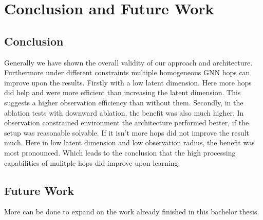 
\chapter{Conclusion and Future Work}
\label{ch:Conclusion}


\section{Conclusion}
Generally we have shown the overall validity of our approach and architecture. Furthermore under different constraints multiple homogeneous GNN hops can improve upon the results. Firstly with a low latent dimension. Here more hops did help and were more efficient than increasing the latent dimension. This suggests a higher observation efficiency than without them. Secondly, in the ablation tests with downward ablation, the benefit was also much higher. In observation constrained environment the architecture performed better, if the setup was reasonable solvable. If it isn't more hops did not improve the result much. Here in low latent dimension and low observation radius, the benefit was most pronounced. Which leads to the conclusion that the high processing capabilities of mulitple hops did improve upon learning.

\section{Future Work}
More can be done to expand on the work already finished in this bachelor thesis.\par




